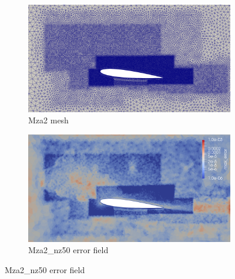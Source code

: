 \begin{figure}[H]
\begin{subfigure}[b]{0.475\textwidth}
	\centering
	\includegraphics[width=1\textwidth]{figures/zonal_adapt_results/Mesh_and_error_plots/Mza2_inplane.png}
	\caption{Mza2 mesh}
	\label{fig:zonal_Mza2_mesh}
\end{subfigure}
\begin{subfigure}[b]{0.475\textwidth}
	\centering
	\includegraphics[width=1\textwidth]{figures/zonal_adapt_results/Mesh_and_error_plots/Mza2_error.png}
	\caption{Mza2\_nz50 error field}
	\label{fig:zonal_Mza2_error}
\end{subfigure}


\end{figure}
